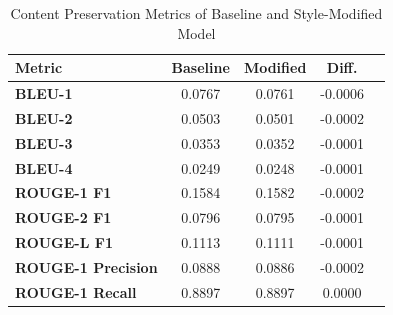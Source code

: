 \documentclass[twocolumn]{article}
\begin{document}
\begin{table}[ht]
\centering
\caption{Content Preservation Metrics of Baseline and Style-Modified Model}
\label{tab:content-preservation}
\begin{tabular}{lcccc}
\hline
\textbf{Metric} & \textbf{Baseline} & \textbf{Modified} & \textbf{Diff.} \\
\hline
\textbf{BLEU-1} & 0.0767 & 0.0761 & -0.0006 \\
\textbf{BLEU-2} & 0.0503 & 0.0501 & -0.0002 \\
\textbf{BLEU-3} & 0.0353 & 0.0352 & -0.0001 \\
\textbf{BLEU-4} & 0.0249 & 0.0248 & -0.0001 \\
\textbf{ROUGE-1 F1} & 0.1584 & 0.1582 & -0.0002 \\
\textbf{ROUGE-2 F1} & 0.0796 & 0.0795 & -0.0001 \\
\textbf{ROUGE-L F1} & 0.1113 & 0.1111 & -0.0001 \\
\textbf{ROUGE-1 Precision} & 0.0888 & 0.0886 & -0.0002 \\
\textbf{ROUGE-1 Recall} & 0.8897 & 0.8897 & 0.0000 \\
\hline
\end{tabular}
\end{table}
\end{document}
